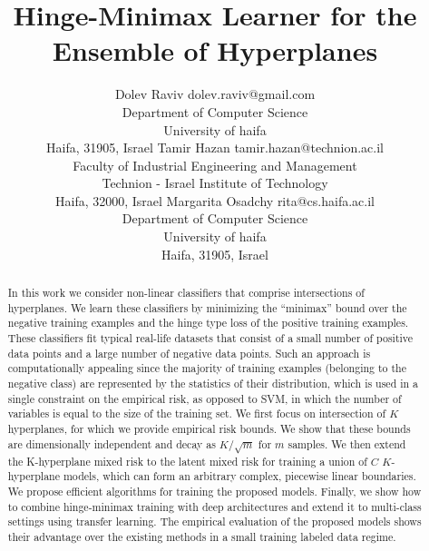 \documentclass[twoside,11pt]{article}
\begin{document}
\title{Hinge-Minimax Learner for the Ensemble of Hyperplanes}

\author{\name Dolev Raviv \email dolev.raviv@gmail.com \\
       \addr Department of Computer Science\\
       University of haifa\\
       Haifa, 31905, Israel
        \AND
       \name Tamir Hazan \email tamir.hazan@technion.ac.il\\
       \addr Faculty of Industrial Engineering and Management\\
       Technion - Israel Institute of Technology\\
       Haifa, 32000, Israel
       \AND
       \name Margarita Osadchy \email rita@cs.haifa.ac.il\\
       \addr Department of Computer Science\\
       University of haifa\\
       Haifa, 31905, Israel}

\maketitle

\begin{abstract}
In this work we consider non-linear classifiers that comprise intersections of hyperplanes. We learn these classifiers by minimizing the ``minimax'' bound over the negative training examples and the hinge type loss of the positive training examples. These classifiers fit typical real-life datasets that consist of a small number of positive data points and a large number of negative data points. Such an approach is computationally appealing since the majority of training examples (belonging to the negative class) are represented by the statistics of their distribution, which is used in a single constraint on the empirical risk, as opposed to SVM, in which the number of variables is equal to the size of the training set. We first focus on intersection of $K$ hyperplanes, for which we provide empirical risk bounds. We show that these bounds are dimensionally independent and decay as $K/\sqrt{m}$ for $m$ samples. We then extend the K-hyperplane mixed risk to  the latent mixed risk for training a union of $C$ $K$-hyperplane models, which can form an arbitrary complex, piecewise linear boundaries.  We propose efficient algorithms for training the proposed models.
Finally, we show how to combine hinge-minimax training with deep architectures and extend it to multi-class settings using transfer learning. The empirical evaluation of the proposed models shows their advantage over the existing methods in a small training labeled data regime.
\end{abstract}
\end{document}
